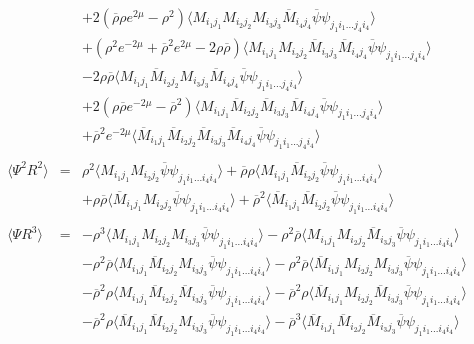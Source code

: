 \documentclass[a4paper,10pt]{report}
\newcommand{\ol}[1]{\overline{#1}}
\newcommand{\rrb}{\overline{\rho}}
\newcommand{\rr}{\rho}
\newcommand{\Mb}{\ol{M}}
\newcommand{\mv}[1]{\langle #1 \rangle}
\newcommand{\ppb}{\ol{\psi}\psi}
\begin{document}
\begin{eqnarray}
          && + 2(\rrb\rr e^{2\mu} - \rr^2) \mv{M_{i_1j_1}M_{i_2j_2}M_{i_3j_3}\Mb_{i_4j_4} \ppb_{j_1i_1...j_4i_4}} \nonumber\\
          && + (\rr^2e^{-2\mu} + \rrb^2e^{2\mu} - 2\rr\rrb) \mv{M_{i_1j_1}M_{i_2j_2}\Mb_{i_3j_3}\Mb_{i_4j_4} \ppb_{j_1i_1...j_4i_4}} \nonumber\\
          && - 2 \rr\rrb \mv{M_{i_1j_1}\Mb_{i_2j_2}M_{i_3j_3}\Mb_{i_4j_4} \ppb_{j_1i_1...j_4i_4}} \nonumber\\
          && + 2(\rr\rrb e^{-2\mu} - \rrb^2) \mv{M_{i_1j_1}\Mb_{i_2j_2}\Mb_{i_3j_3}\Mb_{i_4j_4} \ppb_{j_1i_1...j_4i_4}} \nonumber\\
          && + \rrb^2e^{-2\mu} \mv{\Mb_{i_1j_1}\Mb_{i_2j_2}\Mb_{i_3j_3}\Mb_{i_4j_4} \ppb_{j_1i_1...j_4i_4}}    \\
\nonumber\\
\mv{\Psi^2R^2} &=& \rr^2  \mv{M_{i_1j_1}M_{i_2j_2} \ppb_{j_1i_1...i_4i_4}}
           + \rrb\rr \mv{M_{i_1j_1}\Mb_{i_2j_2} \ppb_{j_1i_1...i_4i_4}} \nonumber\\
          && + \rr\rrb \mv{\Mb_{i_1j_1}M_{i_2j_2} \ppb_{j_1i_1...i_4i_4}}
           + \rrb^2  \mv{\Mb_{i_1j_1}\Mb_{i_2j_2} \ppb_{j_1i_1...i_4i_4}}    \\
\nonumber\\
\mv{\Psi R^3} &=& -\rr^3  \mv{M_{i_1j_1}M_{i_2j_2}M_{i_3j_3} \ppb_{j_1i_1...i_4i_4}}
             - \rr^2\rrb \mv{M_{i_1j_1}M_{i_2j_2}\Mb_{i_3j_3} \ppb_{j_1i_1...i_4i_4}} \nonumber\\
          && - \rr^2\rrb \mv{M_{i_1j_1}\Mb_{i_2j_2}M_{i_3j_3} \ppb_{j_1i_1...i_4i_4}} 
           - \rr^2\rrb \mv{\Mb_{i_1j_1}M_{i_2j_2}M_{i_3j_3} \ppb_{j_1i_1...i_4i_4}} \nonumber\\
          && - \rrb^2\rr \mv{M_{i_1j_1}\Mb_{i_2j_2}\Mb_{i_3j_3} \ppb_{j_1i_1...i_4i_4}}
           - \rrb^2\rr \mv{\Mb_{i_1j_1}M_{i_2j_2}\Mb_{i_3j_3} \ppb_{j_1i_1...i_4i_4}} \nonumber\\
          && - \rrb^2\rr \mv{\Mb_{i_1j_1}\Mb_{i_2j_2}M_{i_3j_3} \ppb_{j_1i_1...i_4i_4}} 
           - \rrb^3 \mv{\Mb_{i_1j_1}\Mb_{i_2j_2}\Mb_{i_3j_3} \ppb_{j_1i_1...i_4i_4}}\nonumber\\
\end{eqnarray}
\end{document}
